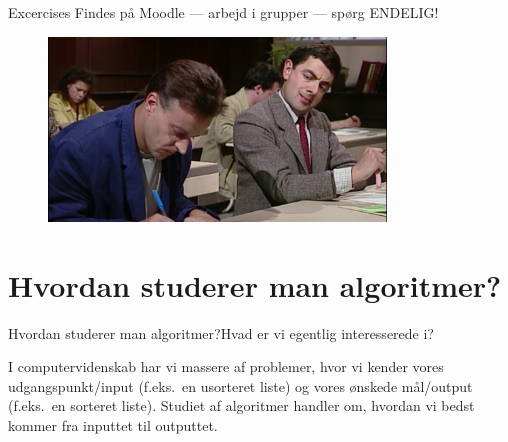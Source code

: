 \documentclass{beamer}
\begin{document}
\begin{frame}{Excercises}{}
    Findes på Moodle --- arbejd i grupper --- spørg ENDELIG!

    \begin{figure}[h]
        \centering
        \includegraphics[width=0.8\textwidth]{exercises}
    \end{figure}
\end{frame}


\section{Hvordan studerer man algoritmer?}

\begin{frame}{Hvordan studerer man algoritmer?}{Hvad er vi egentlig
    interesserede i?}

    I computervidenskab har vi massere af problemer, hvor vi kender vores
    udgangspunkt/input (f.eks.\ en usorteret liste) og vores ønskede mål/output
    (f.eks.\ en sorteret liste). Studiet af algoritmer handler om, hvordan vi
    bedst kommer fra inputtet til outputtet.

\end{frame}
\end{document}
